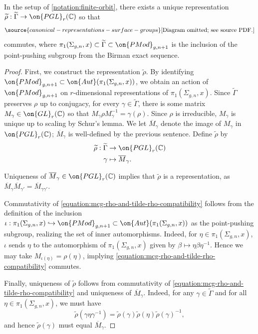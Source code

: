 \begin{lemma}
\notready
	\label{lemma:mcg-rep-construction}
	In the setup of \autoref{notation:finite-orbit}, there exists a unique representation $\widetilde{\rho}:
	\widetilde{\Gamma} \to \on{PGL}_r(\mathbb C)$ so that
	\begin{equation}
		\label{equation:mcg-rho-and-tilde-rho-compatibility}
\source{canonical-representations-surface-groups}
		\text{[Diagram omitted; see source PDF.]}\end{equation}
	commutes,
	where $\pi_1(\Sigma_{g,n}, x) \subset\widetilde{\Gamma}\subset \on{PMod}_{g,n+1}$ is the inclusion
	of the point-pushing subgroup from the Birman exact sequence.
\end{lemma}
\begin{proof}
	First, we construct the representation $\widetilde{\rho}$.
	By identifying
	$\on{PMod}_{g,n+1} \subset \on{Aut}(\pi_1(\Sigma_{g,n},x))$,
	we obtain an action of
	$\on{PMod}_{g,n+1}$ on $r$-dimensional representations of
	$\pi_1(\Sigma_{g,n},x)$.
	Since $\widetilde{\Gamma}$ preserves $\rho$ up to
	conjugacy, for every $\gamma \in \widetilde{\Gamma}$, there is some matrix $M_\gamma \in \on{GL}_r(\mathbb C)$
	so that $M_\gamma \rho M_\gamma^{-1} = \gamma(\rho)$.
	Since $\rho$ is irreducible, $M_\gamma$ is unique up to scaling by
	Schur's lemma.
We let $\overline{M}_\gamma$ denote the image of $M_\gamma$ in
	$\on{PGL}_r(\mathbb C)$; $\overline{M}_\gamma$ is well-defined by the previous sentence.
	Define $\widetilde{\rho}$ by
	\begin{align*}
		\widetilde{\rho}:  \widetilde{\Gamma} &\rightarrow \on{PGL}_r(\mathbb C) \\
		\gamma &\mapsto \overline{M}_\gamma.
	\end{align*}

	Uniqueness of
	$\overline{M}_\gamma \in \on{PGL}_r(\mathbb C)$
	implies that $\widetilde{\rho}$ is a representation, as $\overline{M}_\gamma\overline{M}_{\gamma'}=\overline{M}_{\gamma\gamma'}$.

	Commutativity of
	\eqref{equation:mcg-rho-and-tilde-rho-compatibility}
	follows from the definition of the inclusion $\iota: \pi_1(\Sigma_{g,n}, x) \hookrightarrow
	\on{PMod}_{g,n+1}\subset \on{Aut}(\pi_1(\Sigma_{g,n}, x))$ as the
	point-pushing subgroup, realizing the set of inner automorphisms.
  Indeed, for $\eta\in \pi_1(\Sigma_{g,n}, x)$, $\iota$ sends
	$\eta$ to the automorphism of $\pi_1(\Sigma_{g,n}, x)$ given by $\beta\mapsto \eta \beta
	\eta^{-1}.$
	Hence we may take $M_{\iota(\eta)}=\rho(\eta)$, implying
	\eqref{equation:mcg-rho-and-tilde-rho-compatibility} commutes.

	Finally, uniqueness of $\widetilde{\rho}$ follows from commutativity of \eqref{equation:mcg-rho-and-tilde-rho-compatibility} and uniqueness of $\overline{M}_\gamma$. Indeed, for any $\gamma\in \widetilde{\Gamma}$ and for all $\eta\in \pi_1(\Sigma_{g,n}, x)$, we must have $$\widetilde{\rho}(\gamma\eta\gamma^{-1})=\widetilde{\rho}(\gamma)\widetilde{\rho}(\eta)\widetilde{\rho}(\gamma)^{-1},$$ and hence $\widetilde{\rho}(\gamma)$ must equal $\overline{M}_\gamma$.
\end{proof}
